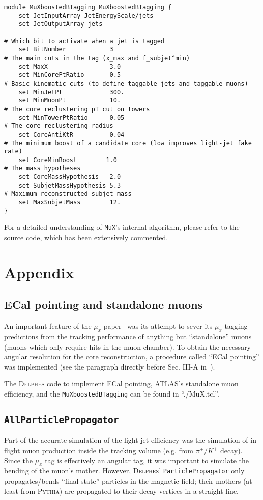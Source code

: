 \documentclass[10pt]{article}
\newcommand{\muX}{$\mu_{x}^{}$}
\newcommand{\muXmodFull}{\texttt{MuXboostedBTagging}}
\newcommand{\muXmod}{\texttt{MuX}}
\newcommand{\delphes}{\textsc{Delphes}}
\begin{document}
\begin{lstlisting}
module MuXboostedBTagging MuXboostedBTagging {
    set JetInputArray JetEnergyScale/jets
    set JetOutputArray jets

# Which bit to activate when a jet is tagged
    set BitNumber            3
# The main cuts in the tag (x_max and f_subjet^min)
    set MaxX                 3.0
    set MinCorePtRatio       0.5
# Basic kinematic cuts (to define taggable jets and taggable muons)
    set MinJetPt             300.
    set MinMuonPt            10.
# The core reclustering pT cut on towers
    set MinTowerPtRatio      0.05
# The core reclustering radius
    set CoreAntiKtR          0.04
# The minimum boost of a candidate core (low improves light-jet fake rate)
    set CoreMinBoost        1.0
# The mass hypotheses
    set CoreMassHypothesis   2.0
    set SubjetMassHypothesis 5.3
# Maximum reconstructed subjet mass
    set MaxSubjetMass        12.
}
\end{lstlisting}

For a detailed understanding of {\muXmod}'s internal algorithm, please refer
to the source code, which has been extensively commented.

\section{Appendix}
\subsection{ECal pointing and standalone muons}

An important feature of the {\muX} paper~\cite{Pedersen:MuX} was its attempt to
sever its {\muX} tagging predictions from the tracking performance of
anything but ``standalone'' muons (muons which only require hits in the muon
chamber). To obtain the necessary angular resolution for the core
reconstruction, a procedure called ``ECal pointing'' was implemented (see the
paragraph directly before Sec. III-A in~\cite{Pedersen:MuX}).

The {\delphes} code to implement ECal pointing, ATLAS's standalone muon
efficiency, and the {\muXmodFull} can be found in ``./MuX.tcl''.

\subsection{\texttt{AllParticlePropagator}}

Part of the accurate simulation of the light jet efficiency was the simulation
of in-flight muon production inside the tracking volume (e.g. from
$\pi^{+}/K^{+}$ decay). Since the {\muX} tag is effectively an angular tag, it
was important to simulate the bending of the muon's mother. However, {\delphes}'
\texttt{ParticlePropagator} only propagates/bends ``final-state'' particles in
the magnetic field; their mothers (at least from \textsc{Pythia}) are propagated
to their decay vertices in a straight line.
\end{document}
